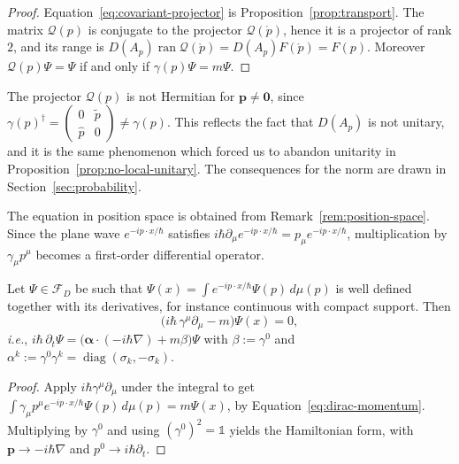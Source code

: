 	\begin{proof}
		Equation~\eqref{eq:covariant-projector} is Proposition~\ref{prop:transport}. The matrix $\mathcal{Q}(p)$ is conjugate to the projector $\mathcal{Q}(\mathring{p})$, hence it is a projector of rank $2$, and its range is $D(A_p)\operatorname{ran}\mathcal{Q}(\mathring{p})=D(A_p)F(\mathring{p})=F(p)$. Moreover $\mathcal{Q}(p)\Psi=\Psi$ if and only if $\gamma(p)\Psi=m\Psi$.
	\end{proof}
	
	\begin{remark}\label{rem:Q-not-hermitian}
		The projector $\mathcal{Q}(p)$ is not Hermitian for $\mathbf{p}\neq\mathbf{0}$, since $\gamma(p)^\dagger=\begin{pmatrix}0&\tilde{p}\\\hat{p}&0\end{pmatrix}\neq\gamma(p)$. This reflects the fact that $D(A_p)$ is not unitary, and it is the same phenomenon which forced us to abandon unitarity in Proposition~\ref{prop:no-local-unitary}. The consequences for the norm are drawn in Section~\ref{sec:probability}.
	\end{remark}
	
	The equation in position space is obtained from Remark~\ref{rem:position-space}. Since the plane wave $e^{-ip\cdot x/\hbar}$ satisfies $i\hbar\partial_\mu e^{-ip\cdot x/\hbar}=p_\mu e^{-ip\cdot x/\hbar}$, multiplication by $\gamma_\mu p^\mu$ becomes a first-order differential operator.
	
	\begin{corollary}\label{cor:dirac-position}
		Let $\Psi\in\mathcal{F}_D$ be such that $\Psi(x)=\int e^{-ip\cdot x/\hbar}\Psi(p)\,d\mu(p)$ is well defined together with its derivatives, for instance continuous with compact support. Then
		\begin{equation}\label{eq:dirac-position}
			\big(i\hbar\,\gamma^\mu\partial_\mu-m\big)\Psi(x)=0,
		\end{equation}
		\textit{i.e.}, $i\hbar\,\partial_t\Psi=\big(\boldsymbol{\alpha}\cdot(-i\hbar\nabla)+m\beta\big)\Psi$ with $\beta:=\gamma^0$ and $\alpha^k:=\gamma^0\gamma^k=\operatorname{diag}(\sigma_k,-\sigma_k)$.
	\end{corollary}
	
	\begin{proof}
		Apply $i\hbar\gamma^\mu\partial_\mu$ under the integral to get $\int\gamma_\mu p^\mu e^{-ip\cdot x/\hbar}\Psi(p)\,d\mu(p)=m\Psi(x)$, by Equation~\eqref{eq:dirac-momentum}. Multiplying by $\gamma^0$ and using $(\gamma^0)^2=\mathbb{1}$ yields the Hamiltonian form, with $\mathbf{p}\to-i\hbar\nabla$ and $p^0\to i\hbar\partial_t$.
	\end{proof}
	
